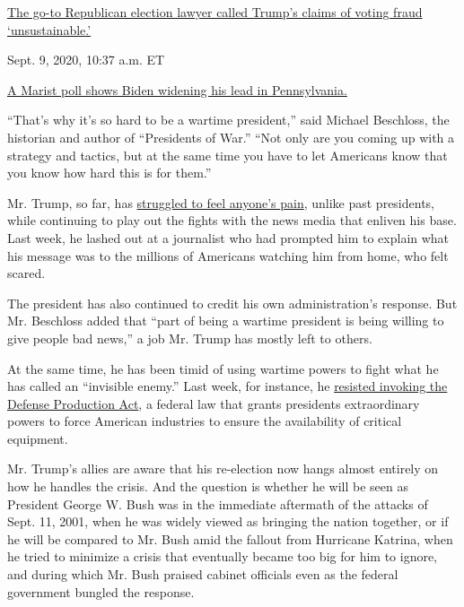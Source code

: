 \href{https://www.nytimes3xbfgragh.onion/live/2020/09/09/us/trump-vs-biden\#the-go-to-republican-election-lawyer-called-trumps-claims-of-voting-fraud-unsustainable}{The
go-to Republican election lawyer called Trump's claims of voting fraud
`unsustainable.'}\href{https://www.nytimes3xbfgragh.onion/live/2020/09/09/us/trump-vs-biden\#a-marist-poll-shows-biden-widening-his-lead-in-pennsylvania}{}

Sept. 9, 2020, 10:37 a.m. ET

\href{https://www.nytimes3xbfgragh.onion/live/2020/09/09/us/trump-vs-biden\#a-marist-poll-shows-biden-widening-his-lead-in-pennsylvania}{A
Marist poll shows Biden widening his lead in Pennsylvania.}

``That's why it's so hard to be a wartime president,'' said Michael
Beschloss, the historian and author of ``Presidents of War.'' ``Not only
are you coming up with a strategy and tactics, but at the same time you
have to let Americans know that you know how hard this is for them.''

Mr. Trump, so far, has
\href{https://www.nytimes3xbfgragh.onion/2020/03/21/us/politics/trump-coronavirus-leadership.html}{struggled
to feel anyone's pain}, unlike past presidents, while continuing to play
out the fights with the news media that enliven his base. Last week, he
lashed out at a journalist who had prompted him to explain what his
message was to the millions of Americans watching him from home, who
felt scared.

The president has also continued to credit his own administration's
response. But Mr. Beschloss added that ``part of being a wartime
president is being willing to give people bad news,'' a job Mr. Trump
has mostly left to others.

At the same time, he has been timid of using wartime powers to fight
what he has called an ``invisible enemy.'' Last week, for instance, he
\href{https://www.nytimes3xbfgragh.onion/2020/03/20/us/politics/trump-coronavirus-supplies.html}{resisted
invoking the Defense Production Act}, a federal law that grants
presidents extraordinary powers to force American industries to ensure
the availability of critical equipment.

Mr. Trump's allies are aware that his re-election now hangs almost
entirely on how he handles the crisis. And the question is whether he
will be seen as President George W. Bush was in the immediate aftermath
of the attacks of Sept. 11, 2001, when he was widely viewed as bringing
the nation together, or if he will be compared to Mr. Bush amid the
fallout from Hurricane Katrina, when he tried to minimize a crisis that
eventually became too big for him to ignore, and during which Mr. Bush
praised cabinet officials even as the federal government bungled the
response.

